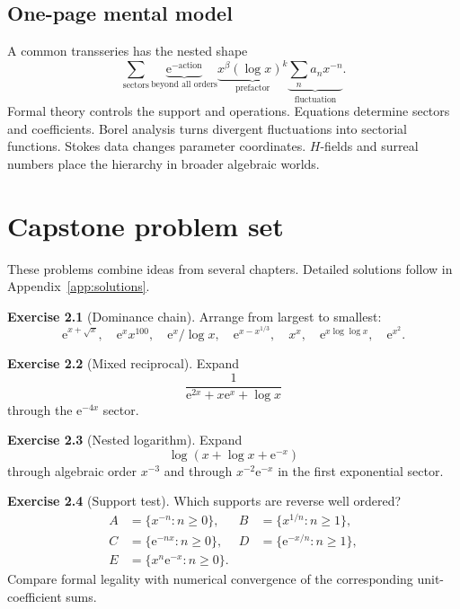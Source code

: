 \documentclass[11pt,oneside,openany]{book}
\newcommand{\e}{\mathrm{e}}
\theoremstyle{plain}
\theoremstyle{definition}
\newtheorem{exercise}{Exercise}[chapter]
\theoremstyle{remark}
\begin{document}
\section{One-page mental model}
A common transseries has the nested shape
\[
  \sum_{\text{sectors}}
  \underbrace{\e^{-\text{action}}}_{\text{beyond all orders}}
  \underbrace{x^\beta(\log x)^k}_{\text{prefactor}}
  \underbrace{\sum_na_nx^{-n}}_{\text{fluctuation}}.
\]
Formal theory controls the support and operations. Equations determine sectors and coefficients. Borel analysis turns divergent fluctuations into sectorial functions. Stokes data changes parameter coordinates. $H$-fields and surreal numbers place the hierarchy in broader algebraic worlds.


\appendix

\chapter{Capstone problem set}
\label{app:problems}

These problems combine ideas from several chapters. Detailed solutions follow in Appendix~\ref{app:solutions}.

\begin{exercise}[Dominance chain]
Arrange from largest to smallest:
\[
  \e^{x+\sqrt{x}},\quad
  \e^xx^{100},\quad
  \e^x/\log x,\quad
  \e^{x-x^{1/3}},\quad
  x^x,\quad
  \e^{x\log\log x},\quad
  \e^{x^2}.
\]
\end{exercise}

\begin{exercise}[Mixed reciprocal]
Expand
\[
  \frac1{\e^{2x}+x\e^x+\log x}
\]
through the $\e^{-4x}$ sector.
\end{exercise}

\begin{exercise}[Nested logarithm]
Expand
\[
  \log(x+\log x+\e^{-x})
\]
through algebraic order $x^{-3}$ and through $x^{-2}\e^{-x}$ in the first exponential sector.
\end{exercise}

\begin{exercise}[Support test]
Which supports are reverse well ordered?
\[
\begin{aligned}
A&=\{x^{-n}:n\ge0\},&
B&=\{x^{1/n}:n\ge1\},\\
C&=\{\e^{-nx}:n\ge0\},&
D&=\{\e^{-x/n}:n\ge1\},\\
E&=\{x^n\e^{-x}:n\ge0\}.&&
\end{aligned}
\]
Compare formal legality with numerical convergence of the corresponding unit-coefficient sums.
\end{exercise}
\end{document}
